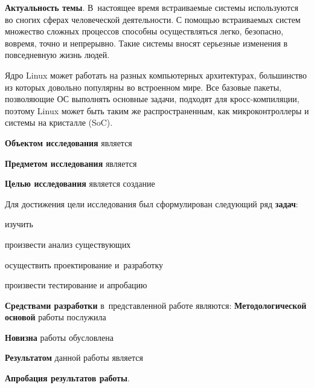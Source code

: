 
\textbf{Актуальность темы}. В~настоящее время встраиваемые системы используются во сногих сферах человеческой деятельности. С помощью встраиваемых систем множество сложных процессов способны осуществляться легко, безопасно, вовремя, точно и непрерывно. Такие системы вносят серьезные изменения в повседневную жизнь людей.

Ядро Linux может работать на разных компьютерных архитектурах, большинство из которых довольно популярны во встроенном мире. Все базовые пакеты, позволяющие ОС выполнять основные задачи, подходят для кросс-компиляции, поэтому Linux может быть таким же распространенным, как микроконтроллеры и системы на кристалле (SoC).

\textbf{Объектом исследования} является 

\textbf{Предметом исследования} является

\textbf{Целью исследования} является создание

Для достижения цели исследования был сформулирован следующий ряд \textbf{задач}:

\begin{dashitemize}
  \item изучить 
  \item произвести анализ существующих 
  \item осуществить проектирование и~разработку
  \item произвести тестирование и апробацию
\end{dashitemize}

\textbf{Средствами разработки} в~представленной работе являются: 
\textbf{Методологической основой} работы послужила 

\textbf{Новизна} работы обусловлена

\textbf{Результатом} данной работы является 

\textbf{Апробация результатов работы}.

\newpage
